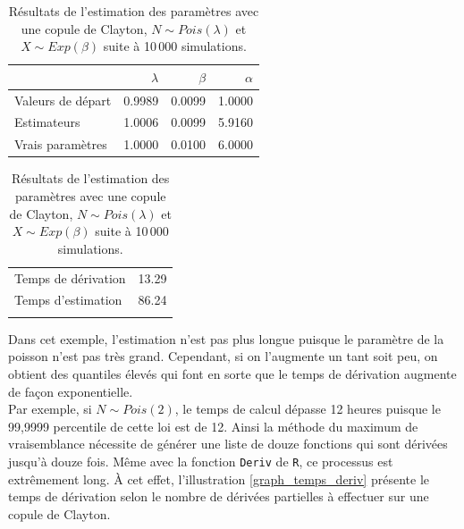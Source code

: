 \documentclass{article}
\begin{document}
		\begin{table}[H]
			\centering
			\begin{tabular}{lrrr}
				\hline
				& $\lambda$ & $\beta$ & $\alpha$ \\ 
				\hline
				Valeurs de départ & 0.9989 & 0.0099 & 1.0000 \\
				Estimateurs & 1.0006 & 0.0099 & 5.9160 \\ 
				Vrais paramètres & 1.0000 & 0.0100 & 6.0000 \\ 
				\hline
			\end{tabular}
		\begin{tabular}{lr}
			\hline
			&  \\ 
			\hline
			Temps de dérivation & 13.29 \\ 
			Temps d'estimation & 86.24 \\ 
			\\
			\hline
		\end{tabular}
			\caption[Résultats du scénario \ref{scenario_Clayton_Pois}]{Résultats de l'estimation des paramètres avec une copule de Clayton, $N\sim Pois(\lambda)$ et $X \sim Exp(\beta)$ suite à 10\,000 simulations.}\label{tbl_Clayton_Poisson}
		\end{table}
	
		Dans cet exemple, l'estimation n'est pas plus longue puisque le paramètre de la poisson n'est pas très grand. Cependant, si on l'augmente un tant soit peu, on obtient des quantiles élevés qui font en sorte que le temps de dérivation augmente de façon exponentielle.\\
	
		Par exemple, si $N \sim Pois(2)$, le temps de calcul dépasse 12 heures puisque le 99,9999 percentile de cette loi est de 12. Ainsi la méthode du maximum de vraisemblance nécessite de générer une liste de douze fonctions qui sont dérivées jusqu'à douze fois. Même avec la fonction \texttt{Deriv} de \texttt{R}, ce processus est extrêmement long. À cet effet, l'illustration \ref{graph_temps_deriv} présente le temps de dérivation selon le nombre de dérivées partielles à effectuer sur une copule de Clayton.
		
\end{document}
